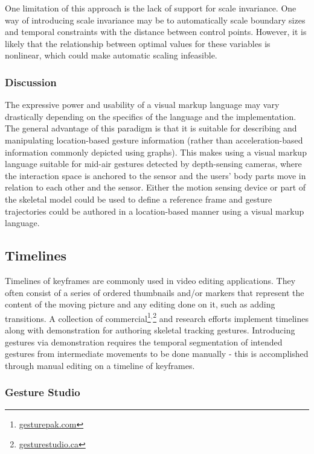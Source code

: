 One limitation of this approach is the lack of support for scale invariance. One way of introducing scale invariance may be to automatically scale boundary sizes and temporal constraints with the distance between control points. However, it is likely that the relationship between optimal values for these variables is nonlinear, which could make automatic scaling infeasible.

\subsubsection{Discussion}

The expressive power and usability of a visual markup language may vary drastically depending on the specifics of the language and the implementation. The general advantage of this paradigm is that it is suitable for describing and manipulating location-based gesture information (rather than acceleration-based information commonly depicted using graphs). This makes using a visual markup language suitable for mid-air gestures detected by depth-sensing cameras, where the interaction space is anchored to the sensor and the users' body parts move in relation to each other and the sensor. Either the motion sensing device or part of the skeletal model could be used to define a reference frame and gesture trajectories could be authored in a location-based manner using a visual markup language.

\subsection{Timelines}

Timelines of keyframes are commonly used in video editing applications. They often consist of a series of ordered thumbnails and/or markers that represent the content of the moving picture and any editing done on it, such as adding transitions. A collection of commercial\footnote{\href{http://www.gesturepak.com}{gesturepak.com}}$^{,}$\footnote{\href{http://www.gesturestudio.ca}{gesturestudio.ca}} and research \parencite{Tang:2013} efforts implement timelines along with demonstration for authoring skeletal tracking gestures. Introducing gestures via demonstration requires the temporal segmentation of intended gestures from intermediate movements to be done manually - this is accomplished through manual editing on a timeline of keyframes.

\subsubsection{Gesture Studio}

